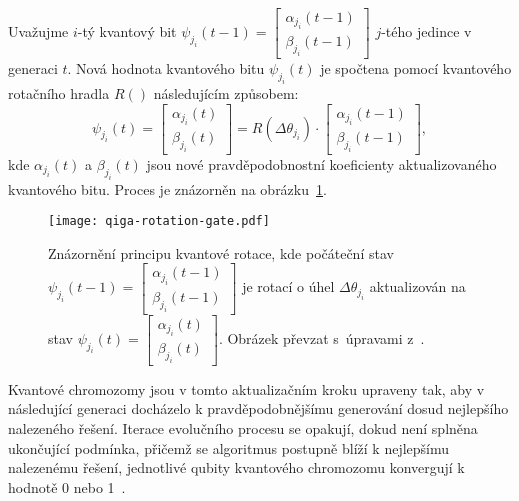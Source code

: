 Uvažujme $i$-tý kvantový bit $\psi_{j_i}\left(t-1\right) = \begin{bmatrix} \alpha_{j_i}\left(t-1\right) \\ \beta_{j_i}\left(t-1\right) \end{bmatrix}$ $j$-tého jedince v generaci $t$. 
Nová hodnota kvantového bitu $\psi_{j_i}\left(t\right)$ je spočtena pomocí kvantového rotačního hradla $R\left(\right)$ následujícím způsobem:
\begin{equation*}\label{eq:qiga-rotation-gate-angles}
    \psi_{j_i}\left(t\right) =
    \begin{bmatrix}
        \alpha_{j_i}\left(t\right) \\
        \beta_{j_i}\left(t\right)
    \end{bmatrix}
    =
    R\left(\Delta\theta_{j_i}\right) \cdot
    \begin{bmatrix}
        \alpha_{j_i}\left(t-1\right) \\
        \beta_{j_i}\left(t-1\right) 
    \end{bmatrix},
\end{equation*}
kde $\alpha_{j_i}\left(t\right)$ a $\beta_{j_i}\left(t\right)$ jsou nové pravděpodobnostní koeficienty aktualizovaného kvantového bitu. Proces je znázorněn na obrázku~\ref{fig:qiga-rotation-gate}.

\begin{figure}[ht!]
    \centering
    \texttt{[image: qiga-rotation-gate.pdf]}
    \caption{Znázornění principu kvantové rotace, kde počáteční stav $\psi_{j_i}\left(t-1\right) = \begin{bmatrix} \alpha_{j_i}\left(t-1\right) \\ \beta_{j_i}\left(t-1\right) \end{bmatrix}$ je rotací o úhel $\Delta\theta_{j_i}$ aktualizován na stav $\psi_{j_i}\left(t\right) = \begin{bmatrix} \alpha_{j_i}\left(t\right) \\ \beta_{j_i}\left(t\right) \end{bmatrix}$. Obrázek převzat s~úpravami z~\cite{qisa}.}
    \label{fig:qiga-rotation-gate}
\end{figure}

Kvantové chromozomy jsou v tomto aktualizačním kroku upraveny tak, aby v následující generaci docházelo k pravděpodobnějšímu generování dosud nejlepšího nalezeného řešení. 
Iterace evolučního procesu se opakují, dokud není splněna ukončující podmínka, přičemž se algoritmus postupně blíží k nejlepšímu nalezenému řešení, jednotlivé qubity kvantového chromozomu konvergují k hodnotě 0 nebo 1~\cite{NaturalComputing,qiga}.

